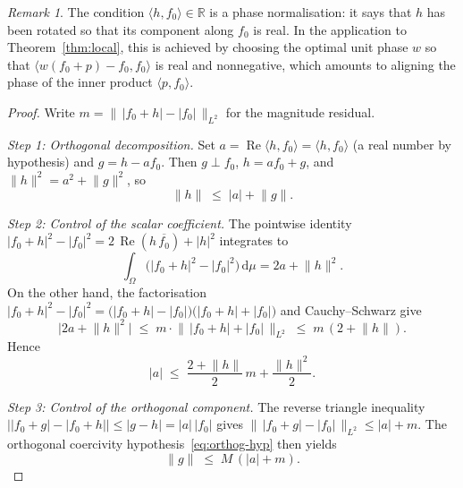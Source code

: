 \documentclass[11pt]{amsart}
\theoremstyle{definition}
\theoremstyle{remark}
\newtheorem{remark}[theorem]{Remark}
\begin{document}
\begin{remark}
The condition $\langle h,f_0\rangle \in \mathbb{R}$ is a phase normalisation: it says that
$h$ has been rotated so that its component along $f_0$ is real.  In the
application to Theorem~\ref{thm:local}, this is achieved by choosing the
optimal unit phase $w$ so that $\langle w(f_0 + p) - f_0,f_0\rangle$ is real and
nonneg\-ative, which amounts to aligning the phase of the inner product
$\langle p,f_0\rangle$.
\end{remark}

\begin{proof}
Write $m = \bigl\|\, \lvert f_0 + h \rvert - \lvert f_0 \rvert \,\bigr\|_{L^2}$ for the
magnitude residual.

\medskip
\noindent
\emph{Step 1: Orthogonal decomposition.}\;
Set $a = \operatorname{Re}\langle h,f_0\rangle = \langle h,f_0\rangle$ (a real number by hypothesis) and
$g = h - a f_0$.  Then $g \perp f_0$, $h = af_0 + g$, and
$\lVert h \rVert^2 = a^2 + \lVert g \rVert^2$, so
\begin{equation}\label{eq:triangle}
\lVert h \rVert \;\le\; \lvert a \rvert + \lVert g \rVert.
\end{equation}

\medskip
\noindent
\emph{Step 2: Control of the scalar coefficient.}\;
The pointwise identity
$\lvert f_0 + h \rvert^2 - \lvert f_0 \rvert^2
= 2\,\operatorname{Re}(h\,\overline{f_0}) + \lvert h \rvert^2$
integrates to
\[
\int_\Omega \bigl(\lvert f_0 + h \rvert^2 - \lvert f_0 \rvert^2\bigr)\,\mathrm{d}\mu
= 2a + \lVert h \rVert^2.
\]
On the other hand, the factorisation
$\lvert f_0 + h \rvert^2 - \lvert f_0 \rvert^2
= \bigl(\lvert f_0 + h \rvert - \lvert f_0 \rvert\bigr)
  \bigl(\lvert f_0 + h \rvert + \lvert f_0 \rvert\bigr)$
and Cauchy--Schwarz give
\[
\lvert 2a + \lVert h \rVert^2 \rvert
\;\le\;
m \cdot \bigl\|\, \lvert f_0 + h \rvert + \lvert f_0 \rvert \,\bigr\|_{L^2}
\;\le\;
m\,(2 + \lVert h \rVert).
\]
Hence
\begin{equation}\label{eq:a-bound}
\lvert a \rvert
\;\le\;
\frac{2 + \lVert h \rVert}{2}\, m
+ \frac{\lVert h \rVert^2}{2}.
\end{equation}

\medskip
\noindent
\emph{Step 3: Control of the orthogonal component.}\;
The reverse triangle inequality
$\bigl\lvert \lvert f_0 + g \rvert - \lvert f_0 + h \rvert \bigr\rvert
\le \lvert g - h \rvert = \lvert a \rvert\,\lvert f_0 \rvert$
gives
$\bigl\|\, \lvert f_0 + g \rvert - \lvert f_0 \rvert \,\bigr\|_{L^2}
\le \lvert a \rvert + m$.
The orthogonal coercivity hypothesis~\eqref{eq:orthog-hyp} then yields
\begin{equation}\label{eq:g-bound}
\lVert g \rVert \;\le\; M\,(\lvert a \rvert + m).
\end{equation}


\end{proof}
\end{document}
